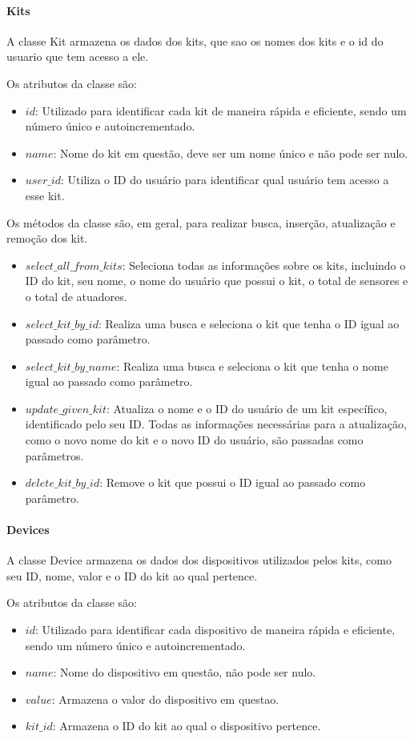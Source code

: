 \documentclass[conference, a4paper, 12pt]{IEEEtran}
\begin{document}
\paragraph{Kits}
A classe Kit armazena os dados dos kits, que sao os nomes dos kits e o id do usuario que tem acesso a ele.

Os atributos da classe são:
\begin{itemize}
  \item $id$: Utilizado para identificar cada kit de maneira rápida e eficiente, sendo um número único e autoincrementado.
  \item $name$: Nome do kit em questão, deve ser um nome único e não pode ser nulo.
  \item $user\_id$: Utiliza o ID do usuário para identificar qual usuário tem acesso a esse kit.
\end{itemize}

Os métodos da classe são, em geral, para realizar busca, inserção, atualização e remoção dos kit.

\begin{itemize}
  \item $select\_all\_from\_kits$: Seleciona todas as informações sobre os kits, incluindo o ID do kit, seu nome, o nome do usuário que possui o kit, o total de sensores e o total de atuadores.
    \item $select\_kit\_by\_id$: Realiza uma busca e seleciona o kit que tenha o ID igual ao passado como parâmetro.
    \item $select\_kit\_by\_name$:  Realiza uma busca e seleciona o kit que tenha o nome igual ao passado como parâmetro.
    \item $update\_given\_kit$: Atualiza o nome e o ID do usuário de um kit específico, identificado pelo seu ID. Todas as informações necessárias para a atualização, como o novo nome do kit e o novo ID do usuário, são passadas como parâmetros.
    \item  $delete\_kit\_by\_id$: Remove o kit que possui o ID igual ao passado como parâmetro.
\end{itemize}

\paragraph{Devices}
A classe Device armazena os dados dos dispositivos utilizados pelos kits, como seu ID, nome, valor e o ID do kit ao qual pertence.

Os atributos da classe são:
\begin{itemize}
  \item $id$: Utilizado para identificar cada dispositivo de maneira rápida e eficiente, sendo um número único e autoincrementado.
  \item $name$: Nome do dispositivo em questão, não pode ser nulo.
  \item $value$: Armazena o valor do dispositivo em questao.
  \item $kit\_id$: Armazena o ID do kit ao qual o dispositivo pertence.
\end{itemize}
\end{document}
